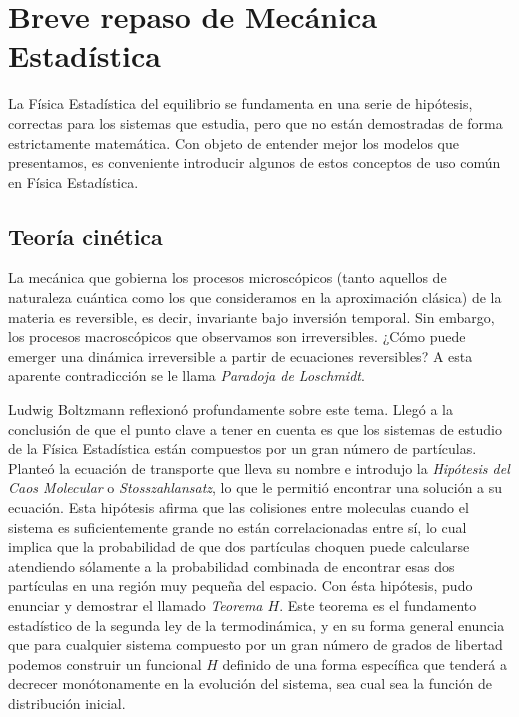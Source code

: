 \documentclass[11pt, a4paper]{article} %
\theoremstyle{named}
\begin{document}
\section{Breve repaso de Mecánica Estadística}\label{sec:fises}

La Física Estadística del equilibrio se fundamenta en una serie de hipótesis, correctas para los sistemas que estudia, pero que no están demostradas de forma estrictamente matemática.
Con objeto de entender mejor los modelos que presentamos, es conveniente introducir algunos de estos conceptos de uso común en Física Estadística.

\subsection{Teoría cinética}

La mecánica que gobierna los procesos microscópicos \cite{huang}(tanto aquellos de naturaleza cuántica como los que consideramos en la aproximación clásica) de la materia es reversible, es decir, invariante bajo inversión temporal. Sin embargo, los procesos macroscópicos que observamos son irreversibles. ¿Cómo puede emerger una dinámica irreversible a partir de ecuaciones reversibles? A esta aparente contradicción se le llama \textit{Paradoja de Loschmidt}.

Ludwig Boltzmann reflexionó profundamente sobre este tema. Llegó a la conclusión de que el punto clave a tener en cuenta es que los sistemas de estudio de la Física Estadística están compuestos por un gran número de partículas. Planteó la ecuación de transporte que lleva su nombre e introdujo la \textit{Hipótesis del Caos Molecular} o \textit{Stosszahlansatz}, lo que le permitió encontrar una solución a su ecuación.
Esta hipótesis afirma que las colisiones entre moleculas cuando el sistema es suficientemente grande no están correlacionadas entre sí, lo cual implica que la probabilidad de que dos partículas choquen puede calcularse atendiendo sólamente a la probabilidad combinada de encontrar esas dos partículas en una región muy pequeña del espacio.
Con ésta hipótesis, pudo enunciar y demostrar el llamado \textit{Teorema $H$}.
Este teorema es el fundamento estadístico de la segunda ley de la termodinámica, y en su forma general enuncia que para cualquier sistema compuesto por un gran número de grados de libertad podemos construir un funcional $H$ definido de una forma específica que tenderá a decrecer monótonamente en la evolución del sistema, sea cual sea la función de distribución inicial.
\end{document}
